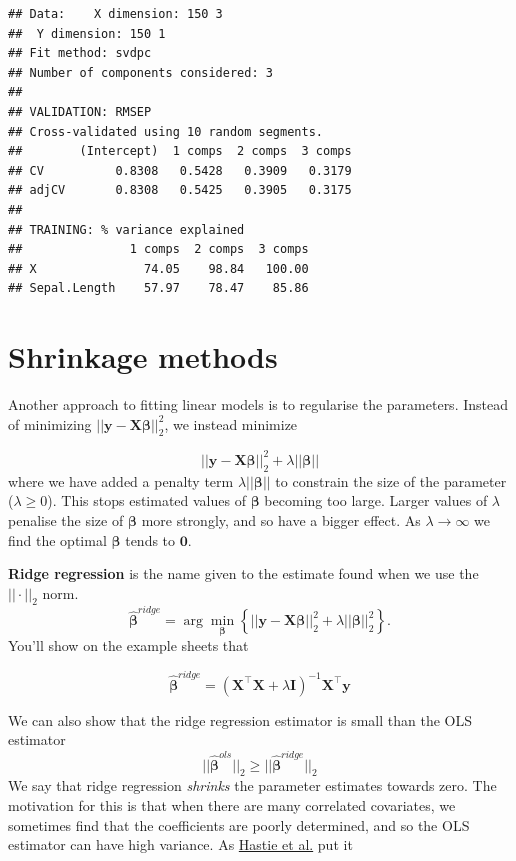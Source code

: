 \documentclass[
]{book}
\theoremstyle{definition}
\theoremstyle{definition}
\theoremstyle{definition}
\theoremstyle{definition}
\theoremstyle{remark}
\begin{document}
\begin{verbatim}
## Data:    X dimension: 150 3 
##  Y dimension: 150 1
## Fit method: svdpc
## Number of components considered: 3
## 
## VALIDATION: RMSEP
## Cross-validated using 10 random segments.
##        (Intercept)  1 comps  2 comps  3 comps
## CV          0.8308   0.5428   0.3909   0.3179
## adjCV       0.8308   0.5425   0.3905   0.3175
## 
## TRAINING: % variance explained
##               1 comps  2 comps  3 comps
## X               74.05    98.84   100.00
## Sepal.Length    57.97    78.47    85.86
\end{verbatim}

\section{Shrinkage methods}\label{shrinkage-methods}

Another approach to fitting linear models is to regularise the parameters. Instead of minimizing \(||\mathbf y- \mathbf X\boldsymbol \beta||^2_2\), we instead minimize

\[||\mathbf y- \mathbf X\boldsymbol \beta||^2_2+\lambda||\boldsymbol \beta||\]
where we have added a penalty term \(\lambda||\boldsymbol \beta||\) to constrain the size of the parameter (\(\lambda\geq 0\)). This stops estimated values of \(\boldsymbol \beta\) becoming too large.
Larger values of \(\lambda\) penalise the size of \(\boldsymbol \beta\) more strongly, and so have a bigger effect. As \(\lambda \rightarrow \infty\) we find the optimal \(\boldsymbol \beta\) tends to \({\boldsymbol 0}\).

\textbf{Ridge regression} is the name given to the estimate found when we use the \(||\cdot||_2\) norm.
\[\hat{\boldsymbol \beta}^{ridge} = \arg \min_{\boldsymbol \beta} \left\{||\mathbf y- \mathbf X\boldsymbol \beta||^2_2+\lambda||\boldsymbol \beta||_2^2 \right\}.\]
You'll show on the example sheets that

\[\hat{\boldsymbol \beta}^{ridge} = (\mathbf X^\top \mathbf X+ \lambda\mathbf I)^{-1}\mathbf X^\top \mathbf y\]

We can also show that the ridge regression estimator is small than the OLS estimator
\[||\hat{\boldsymbol \beta}^{ols}||_2 \geq ||\hat{\boldsymbol \beta}^{ridge}||_2\]
We say that ridge regression \emph{shrinks} the parameter estimates towards zero. The motivation for this is that when there are many correlated covariates, we sometimes find that the coefficients are poorly determined, and so the OLS estimator can have high variance. As \href{https://web.stanford.edu/~hastie/Papers/ESLII.pdf}{Hastie et al.} put it
\end{document}
